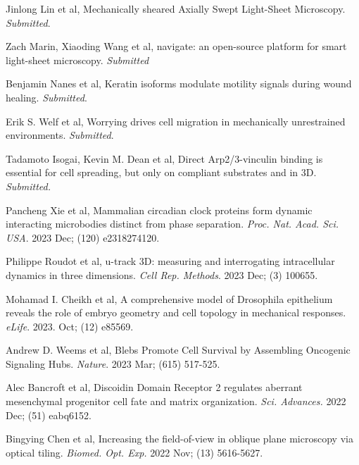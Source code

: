 
\begin{etaremune}

\item Jinlong Lin et al, Mechanically sheared Axially Swept Light-Sheet Microscopy. {\it Submitted}.

\item Zach Marin, Xiaoding Wang et al, navigate: an open-source platform for smart light-sheet microscopy. {\it Submitted}

\item Benjamin Nanes et al, Keratin isoforms modulate motility signals during wound healing. {\it Submitted}.

\item Erik S. Welf et al, Worrying drives cell migration in mechanically unrestrained environments. {\it Submitted}.

\item Tadamoto Isogai, Kevin M. Dean et al, Direct Arp2/3-vinculin binding is essential for cell spreading, but only on compliant substrates and in 3D. {\it Submitted.}  

\item Pancheng Xie et al, Mammalian circadian clock proteins form dynamic interacting microbodies distinct from phase separation. {\it Proc. Nat. Acad. Sci. USA}. 2023 Dec; (120) e2318274120.

\item Philippe Roudot et al, u-track 3D: measuring and interrogating intracellular dynamics in three dimensions.  {\it Cell Rep. Methods}. 2023 Dec; (3) 100655.

\item Mohamad I. Cheikh et al, A comprehensive model of Drosophila epithelium reveals the role of embryo geometry and cell topology in mechanical responses. {\it eLife}. 2023. Oct; (12) e85569.

\item Andrew D. Weems et al, Blebs Promote Cell Survival by Assembling Oncogenic Signaling Hubs. {\it Nature}. 2023 Mar; (615) 517-525.

\item Alec Bancroft et al, Discoidin Domain Receptor 2 regulates aberrant mesenchymal progenitor cell fate and matrix organization. {\it Sci. Advances.} 2022 Dec; (51) eabq6152.

\item Bingying Chen et al, Increasing the field-of-view in oblique plane microscopy via optical tiling. {\it Biomed. Opt. Exp.} 2022 Nov; (13) 5616-5627.


\end{etaremune}
